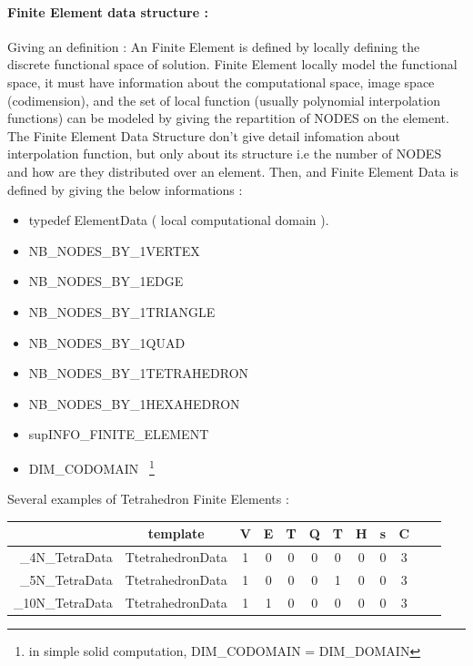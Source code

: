 \documentclass[a4paper,10pt]{article}
\begin{document}
\paragraph{Finite Element data structure : }
Giving an definition : An Finite Element is defined by locally defining the discrete functional space of solution. Finite Element locally model the functional space, it must have information about the computational space, image space (codimension), and the set of local function (usually polynomial interpolation functions) can be modeled by giving the repartition of NODES on the element. The Finite Element Data Structure don't give detail infomation about interpolation function, but only about its structure i.e  the number of NODES and how are they distributed over an element. Then, and Finite Element Data is defined by giving the below informations : 
\begin{itemize}
 \item typedef ElementData ( local computational domain ).
 \item NB\_NODES\_BY\_1VERTEX      
 \item NB\_NODES\_BY\_1EDGE        
 \item NB\_NODES\_BY\_1TRIANGLE   
 \item NB\_NODES\_BY\_1QUAD        
 \item NB\_NODES\_BY\_1TETRAHEDRON  
 \item NB\_NODES\_BY\_1HEXAHEDRON  
 \item supINFO\_FINITE\_ELEMENT  
 \item DIM\_CODOMAIN  ~\footnote{in simple solid computation, DIM\_CODOMAIN = DIM\_DOMAIN}
\end{itemize}
Several examples of Tetrahedron Finite Elements :
\begin{center}
  \begin{tabular}{|r|c|c|c|c|c|c|c|c|c|c|c|}
    \hline
                         & template     &V&E&T&Q&T&H&s&C   \\
    \hline
        \_4N\_TetraData  & TtetrahedronData &1&0&0&0&0&0&0&3  \\
    \hline
        \_5N\_TetraData  & TtetrahedronData &1&0&0&0&1&0&0&3  \\
    \hline
       \_10N\_TetraData  & TtetrahedronData &1&1&0&0&0&0&0&3  \\
    \hline
  \end{tabular}
\end{center}
\end{document}
